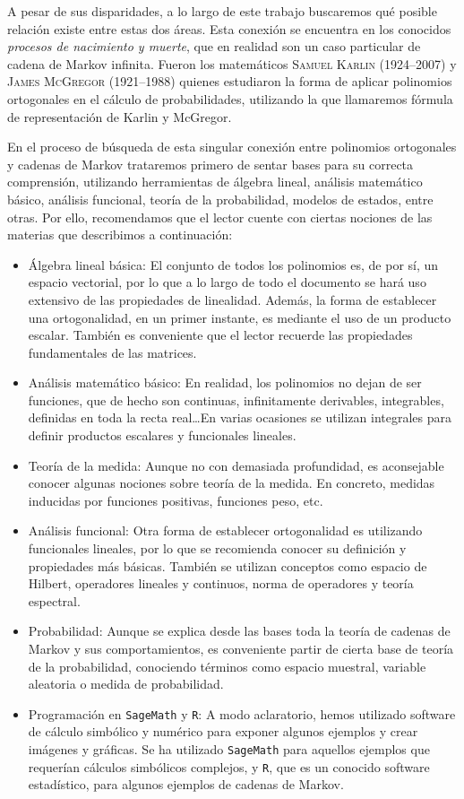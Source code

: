 A pesar de sus disparidades, a lo largo de este trabajo buscaremos qué posible relación existe entre estas dos áreas. Esta conexión se encuentra en los conocidos \textit{procesos de nacimiento y muerte}, que en realidad son un caso particular de cadena de Markov infinita. Fueron los matemáticos \textsc{Samuel Karlin} (1924--2007) y \textsc{James McGregor} (1921--1988) quienes estudiaron la forma de aplicar polinomios ortogonales en el cálculo de probabilidades, utilizando la que llamaremos fórmula de representación de Karlin y McGregor.

En el proceso de búsqueda de esta singular conexión entre polinomios ortogonales y cadenas de Markov trataremos primero de sentar bases para su correcta comprensión, utilizando herramientas de álgebra lineal, análisis matemático básico, análisis funcional, teoría de la probabilidad, modelos de estados, entre otras. Por ello, recomendamos que el lector cuente con ciertas nociones de las materias que describimos a continuación:
\begin{itemize}
    \item Álgebra lineal básica: El conjunto de todos los polinomios es, de por sí, un espacio vectorial, por lo que a lo largo de todo el documento se hará uso extensivo de las propiedades de linealidad. Además, la forma de establecer una ortogonalidad, en un primer instante, es mediante el uso de un producto escalar. También es conveniente que el lector recuerde las propiedades fundamentales de las matrices.
    \item Análisis matemático básico: En realidad, los polinomios no dejan de ser funciones, que de hecho son continuas, infinitamente derivables, integrables, definidas en toda la recta real\dots En varias ocasiones se utilizan integrales para definir productos escalares y funcionales lineales.
    \item Teoría de la medida: Aunque no con demasiada profundidad, es aconsejable conocer algunas nociones sobre teoría de la medida. En concreto, medidas inducidas por funciones positivas, funciones peso, etc.
    \item Análisis funcional: Otra forma de establecer ortogonalidad es utilizando funcionales lineales, por lo que se recomienda conocer su definición y propiedades más básicas. También se utilizan conceptos como espacio de Hilbert, operadores lineales y continuos, norma de operadores y teoría espectral.
    \item Probabilidad: Aunque se explica desde las bases toda la teoría de cadenas de Markov y sus comportamientos, es conveniente partir de cierta base de teoría de la probabilidad, conociendo términos como espacio muestral, variable aleatoria o medida de probabilidad.
    \item Programación en \texttt{SageMath} y \texttt{R}: A modo aclaratorio, hemos utilizado software de cálculo simbólico y numérico para exponer algunos ejemplos y crear imágenes y gráficas. Se ha utilizado \texttt{SageMath} para aquellos ejemplos que requerían cálculos simbólicos complejos, y \texttt{R}, que es un conocido software estadístico, para algunos ejemplos de cadenas de Markov.
\end{itemize}

